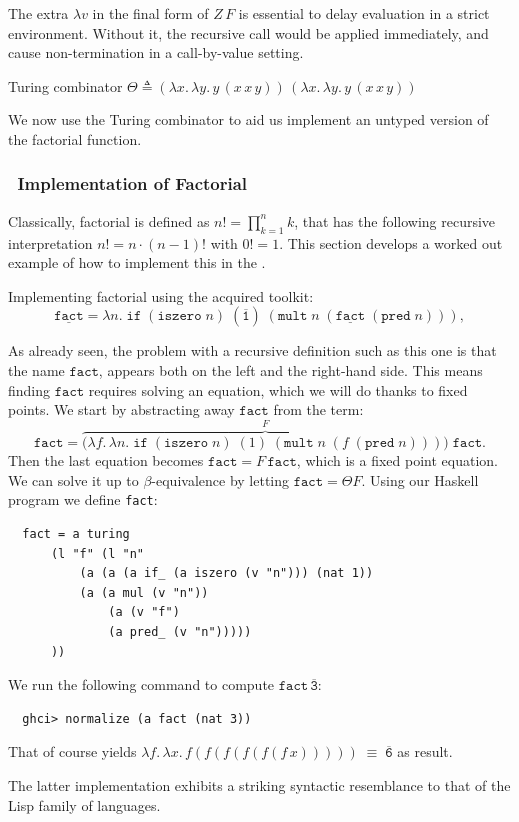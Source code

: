 \begin{remark}
  The extra $\lambda v$ in the final form of $Z\,F$ is essential to delay evaluation in a strict environment. Without it, the recursive call would be applied immediately, and cause non-termination in a call-by-value setting.
\end{remark}
\begin{definition} Turing combinator \( \Theta \triangleq (\lambda x.\, \lambda y.\, y\, (x\, x\, y))\, (\lambda x.\, \lambda y.\, y\, (x\, x\, y)) \)
\end{definition}
We now use the Turing combinator to aid us implement an untyped version of the factorial function.
\subsubsection{\centering \lCalc \ Implementation of Factorial}
Classically, factorial is defined as $n! = \prod_{k=1}^{n} k$, that has the following recursive interpretation $n! = n \cdot (n-1)!$ with $0! = 1$. This section develops a worked out example of how to implement this in the \lcalc.
\begin{example} Implementing factorial using the acquired toolkit:
  \[
    \underline{\texttt{fact}}
    = \lambda n.\; \texttt{if}\;(\texttt{iszero}\; n)\;(\overline{\texttt{1}})\;(\texttt{mult}\; n\;(\underline{\texttt{fact}}\;(\texttt{pred}\; n))),
  \]
\end{example}
\noindent As already seen, the problem with a recursive definition such as this one is that the name $\texttt{fact}$, appears both on the left and the right-hand side. This means finding $\texttt{fact}$ requires solving an equation, which we will do thanks to fixed points. We start by abstracting away $\texttt{fact}$ from the term:
\[
  \texttt{fact}
  = \overbrace{\bigl(\lambda f.\,\lambda n.\; \texttt{if}\;(\texttt{iszero}\; n)\;(1)\;(\texttt{mult}\; n\;(f\;(\texttt{pred}\; n)))\bigr)}^{F}\;\texttt{fact}.
\]
\noindent Then the last equation becomes $\texttt{fact} = F \, \texttt{fact}$, which is a fixed point equation.
We can solve it up to $\beta$-equivalence by letting \( \texttt{fact} = \Theta F \). Using our Haskell program we define \texttt{fact}:
\begin{verbatim}
  fact = a turing
      (l "f" (l "n"
          (a (a (a if_ (a iszero (v "n"))) (nat 1))
          (a (a mul (v "n"))
              (a (v "f")
              (a pred_ (v "n")))))
      ))
\end{verbatim}
\noindent We run the following command to compute $\texttt{fact} \,  \overline{\texttt{3}}$:
\begin{verbatim}
  ghci> normalize (a fact (nat 3))
\end{verbatim}
\noindent That of course yields $ \lambda f.\,\lambda x.\, f(f(f(f(f(f\,x))))) \;\equiv\; \overline{\texttt{6}}$ as result.
\begin{note}
  The latter implementation exhibits a striking syntactic resemblance to that of the Lisp family of languages.
\end{note}

